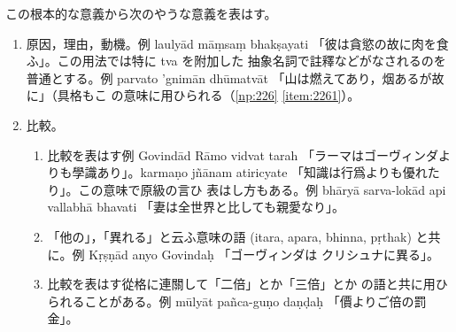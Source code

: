 この根本的な意義から次のやうな意義を表はす。
\begin{enumerate}[label=(\arabic*)]
\item 原因，理由，動機。例 laulyād māṃsaṃ bhakṣayati
「彼は貪慾の故に肉を食ふ」。この用法では特に tva を附加した
抽象名詞で註釋などがなされるのを普通とする。例 parvato
'gnimān dhūmatvāt 「山は燃えてあり，烟あるが故に」（具格もこ
の意味に用ひられる（\ref{np:226} \ref{item:2261}）。
\item 比較。
\begin{enumerate}[label=(\alph*)]
\item 比較を表はす例 Govindād Rāmo vidvat\-%
tarah 「ラーマはゴーヴィンダよりも學識あり」。karmaṇo jñānam
atiricyate 「知識は行爲よりも優れたり」。この意味で原級の言ひ
表はし方もある。例 bhāryā sarva-lokād api vallabhā bhavati
「妻は全世界と比しても親愛なり」。
\item 「他の」，「異れる」と云ふ意味の語 (itara, apara, bhinna,
pṛthak) と共に。例 Kṛṣṇād anyo Govindaḥ 「ゴーヴィンダは
クリシュナに異る」。
\item 比較を表はす從格に連關して「二倍」とか「三倍」とか
の語と共に用ひられることがある。例 mūlyāt pañca-guṇo
daṇḍaḥ 「價よりご倍の罰金」。
\end{enumerate}
\end{enumerate}

